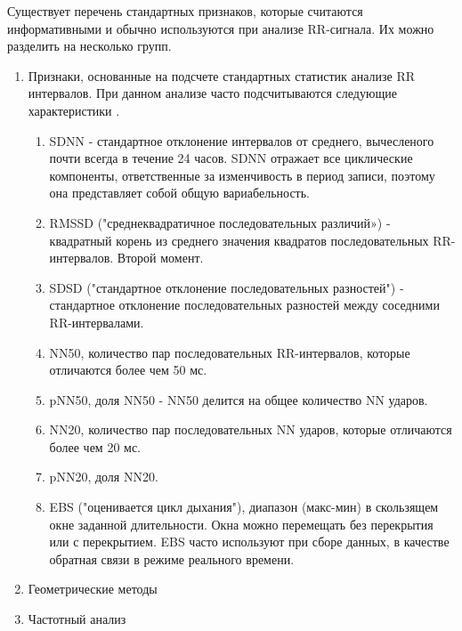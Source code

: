 Существует перечень стандартных признаков, которые считаются информативными и обычно используются при анализе RR-сигнала.
Их можно разделить на несколько групп.

\begin{enumerate}
	\item Признаки, основанные на подсчете стандартных статистик анализе RR интервалов. При данном анализе часто подсчитываются следующие характеристики \cite{pNN, metric_of_hrv}.
	\begin{enumerate}
		\item SDNN - стандартное отклонение интервалов от среднего, вычесленого почти всегда в течение 24 часов. SDNN отражает все циклические компоненты, ответственные за изменчивость в период записи, поэтому она представляет собой общую вариабельность.
		\item 	RMSSD ("среднеквадратичное последовательных различий») - квадратный корень из среднего значения квадратов последовательных RR-интервалов. Второй момент.
		\item SDSD ("стандартное отклонение последовательных разностей") - стандартное отклонение последовательных разностей между соседними  RR-интервалами.
		\item NN50, количество пар последовательных RR-интервалов, которые отличаются более чем 50 мс.
		\item pNN50, доля NN50 - NN50 делится на общее количество NN ударов.
		\item 	NN20, количество пар последовательных NN ударов, которые отличаются более чем 20 мс.
		\item pNN20, доля NN20.
		\item EBS ("оценивается цикл дыхания"), диапазон (макс-мин) в скользящем окне заданной длительности. Окна можно перемещать без перекрытия или с перекрытием. EBS часто используют при сборе данных, в качестве обратная связи в режиме реального времени.
	\end{enumerate}
	\item Геометрические методы \cite{geometric_metric}
	
	\item Частотный анализ
	

\end{enumerate}
